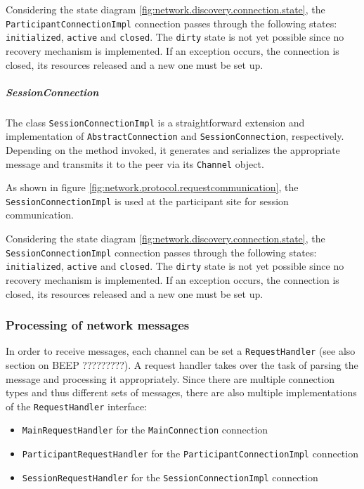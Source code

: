 Considering the state diagram \ref{fig:network.discovery.connection.state}, the \texttt{ParticipantConnectionImpl} connection passes through the following states: \texttt{initialized}, \texttt{active} and \texttt{closed}. The \texttt{dirty} state is not yet possible since no recovery mechanism is implemented. If an exception occurs, the connection is closed, its resources released and a new one must be set up.

\subparagraph{SessionConnection}
The class \texttt{SessionConnectionImpl} is a straightforward extension and implementation of \texttt{AbstractConnection} and \texttt{SessionConnection}, respectively. Depending on the method invoked, it generates and serializes the appropriate message and transmits it to the peer via its \texttt{Channel} object.

As shown in figure \ref{fig:network.protocol.requestcommunication}, the \texttt{SessionConnectionImpl} is used at the participant site for session communication.

Considering the state diagram \ref{fig:network.discovery.connection.state}, the \texttt{SessionConnectionImpl} connection passes through the following states: \texttt{initialized}, \texttt{active} and \texttt{closed}. The \texttt{dirty} state is not yet possible since no recovery mechanism is implemented. If an exception occurs, the connection is closed, its resources released and a new one must be set up.

\subsubsection{Processing of network messages}
In order to receive messages, each channel can be set a \texttt{RequestHandler} (see also section on BEEP ?????????). A request handler takes over the task of parsing the message and processing it appropriately. Since there are multiple connection types and thus different sets of messages, there are also multiple implementations of the \texttt{RequestHandler} interface:

\begin{itemize}
 \item \texttt{MainRequestHandler} for the  \texttt{MainConnection} connection
 \item \texttt{ParticipantRequestHandler} for the \texttt{ParticipantConnectionImpl} connection
 \item \texttt{SessionRequestHandler} for the \texttt{SessionConnectionImpl} connection
\end{itemize}

